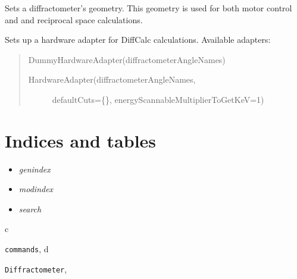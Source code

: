 \documentclass[letterpaper,10pt,english]{sphinxmanual}
\begin{document}
\begin{fulllineitems}
\begin{fulllineitems}
\end{fulllineitems}


\begin{fulllineitems}
\label{Developer Manual:Diffractometer.Diffractometer.setGeometry}
Sets a diffractometer's geometry. This geometry is used for both motor control and
and reciprocal space calculations.

\end{fulllineitems}


\begin{fulllineitems}
\label{Developer Manual:Diffractometer.Diffractometer.setHardwareAdapter}
Sets up a hardware adapter for DiffCalc calculations.
Available adapters:
\begin{quote}

DummyHardwareAdapter(diffractometerAngleNames)
\begin{description}
\item[{HardwareAdapter(diffractometerAngleNames, }] \leavevmode
defaultCuts=\{\}, 
energyScannableMultiplierToGetKeV=1)

\end{description}
\end{quote}

\end{fulllineitems}


\end{fulllineitems}



\chapter{Indices and tables}
\label{index:indices-and-tables}\begin{itemize}
\item {} 
\emph{genindex}

\item {} 
\emph{modindex}

\item {} 
\emph{search}

\end{itemize}


\renewcommand{\indexname}{Python Module Index}
\begin{theindex}
\def\bigletter#1{{\Large\sffamily#1}\nopagebreak\vspace{1mm}}
\bigletter{c}
\item {\texttt{commands}}, \pageref{Manual:module-commands}
\indexspace
\bigletter{d}
\item {\texttt{Diffractometer}}, \pageref{Manual:module-Diffractometer}
\end{theindex}

\renewcommand{\indexname}{Index}
\printindex
\end{document}
